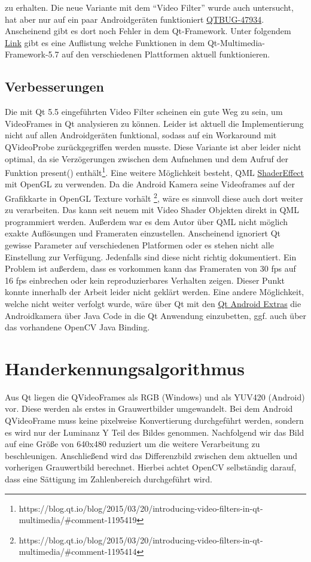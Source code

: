 zu erhalten. Die neue Variante mit dem "`Video Filter"' wurde auch untersucht, hat aber nur auf ein paar Androidgeräten funktioniert \href{https://bugreports.qt.io/browse/QTBUG-47934/}{QTBUG-47934}. Anscheinend gibt es dort noch Fehler in dem Qt-Framework. Unter folgendem \href{https://wiki.qt.io/Qt_5.7_Multimedia_Backends}{Link} gibt es eine Auflistung welche Funktionen in dem Qt-Multimedia-Framework-5.7 auf den verschiedenen Plattformen aktuell funktionieren.

\subsection{Verbesserungen}
Die mit Qt 5.5 eingeführten Video Filter scheinen ein gute Weg zu sein, um VideoFrames in Qt analysieren zu können. Leider ist aktuell die Implementierung nicht auf allen Androidgeräten funktional, sodass auf ein Workaround mit QVideoProbe zurückgegriffen werden musste. Diese Variante ist aber leider nicht optimal, da sie Verzögerungen zwischen dem Aufnehmen und dem Aufruf der Funktion present() enthält\footnote{https://blog.qt.io/blog/2015/03/20/introducing-video-filters-in-qt-multimedia/\#comment-1195419}. Eine weitere Möglichkeit besteht, QML \href{http://doc.qt.io/qt-5/qml-qtquick-shadereffect.html}{ShaderEffect} mit OpenGL zu verwenden. Da die Android Kamera seine Videoframes auf der Grafikkarte in OpenGL Texture vorhält \footnote{https://blog.qt.io/blog/2015/03/20/introducing-video-filters-in-qt-multimedia/\#comment-1195414}, wäre es sinnvoll diese auch dort weiter zu verarbeiten. Das kann seit neuem mit Video Shader Objekten direkt in QML programmiert werden. Außerdem war es dem Autor über QML nicht möglich exakte Auflösungen und Frameraten einzustellen. Anscheinend ignoriert Qt gewisse Parameter auf verschiedenen Platformen oder es stehen nicht alle Einstellung zur Verfügung. Jedenfalls sind diese nicht richtig dokumentiert. Ein Problem ist außerdem, dass es vorkommen kann das Frameraten von 30 fps auf 16 fps einbrechen oder kein reproduzierbares Verhalten zeigen. Dieser Punkt konnte innerhalb der Arbeit leider nicht geklärt werden. Eine andere Möglichkeit, welche nicht weiter verfolgt wurde, wäre über Qt mit den \href{http://doc.qt.io/qt-5/qtandroidextras-module.html}{Qt Android Extras} die Androidkamera über Java Code in die Qt Anwendung einzubetten, ggf. auch über das vorhandene OpenCV Java Binding. 

\section{Handerkennungsalgorithmus}
Aus Qt liegen die QVideoFrames als RGB (Windows) und als YUV420 (Android) vor. Diese werden als erstes in Grauwertbilder umgewandelt. Bei dem Android QVideoFrame muss keine pixelweise Konvertierung durchgeführt werden, sondern es wird nur der Luminanz Y Teil des Bildes genommen. Nachfolgend wir das Bild auf eine Größe von 640x480 reduziert um die weitere Verarbeitung zu beschleunigen. Anschließend wird das Differenzbild zwischen dem aktuellen und vorherigen Grauwertbild berechnet. Hierbei achtet OpenCV selbständig darauf, dass eine Sättigung im Zahlenbereich durchgeführt wird.


